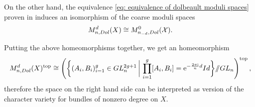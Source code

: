 On the other hand, the equivalence \eqref{eq: equivalence of dolbeault moduli spaces} proven in  induces an isomorphism of the coarse moduli spaces
\begin{equation}
M_{n, Dol}^d(X) \cong M_{n_{-d}, Dol}^0(\mathcal{X}).
\end{equation}

\begin{prop}
Putting the above homeomorphisms together, we get an homeomorphism
\begin{equation}
M_{n, Dol}^d(X)^{\text{top}} \cong \left( \bigg\{ (A_i, B_i)_{i = 1}^g \in GL_n^{2g +1} \,\bigg|\, \prod_{i=1}^{g}[A_i, B_i] = \mathrm{e}^{-\frac{2 \pi \mathrm{i}}{n} d} Id \bigg\} /\!\!/ GL_n \right)^{\text{top}},
\end{equation}
therefore the space on the right hand side can be interpreted as version of the character variety for bundles of nonzero degree on $X$.
\end{prop}

